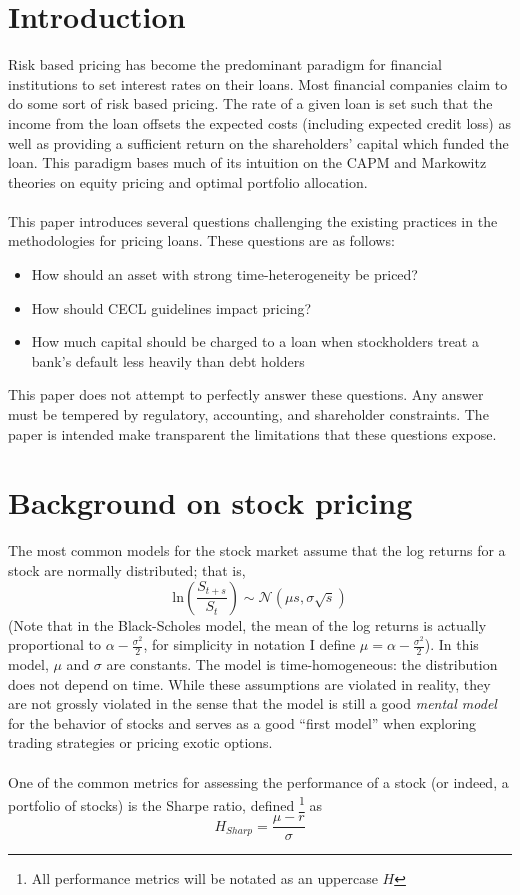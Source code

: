 \documentclass{article}
\begin{document}
\section{Introduction}
Risk based pricing has become the predominant paradigm for financial institutions to set interest rates on their loans.  Most financial companies claim to do some sort of risk based pricing.  The rate of a given loan is set such that the income from the loan offsets the expected costs (including expected credit loss) as well as providing a sufficient return on the shareholders' capital which funded the loan.  This paradigm bases much of its intuition on the CAPM and Markowitz theories on equity pricing and optimal portfolio allocation.  
\\
\\
This paper introduces several questions challenging the existing practices in the methodologies for pricing loans.  These questions are as follows:
\begin{itemize}
\item How should an asset with strong time-heterogeneity be priced?  
\item How should CECL guidelines impact pricing? 
\item How much capital should be charged to a loan when stockholders treat a bank's default less heavily than debt holders
\end{itemize}

This paper does not attempt to perfectly answer these questions.  Any answer must be tempered by regulatory, accounting, and shareholder constraints.  The paper is intended make transparent the limitations that these questions expose.  

\section{Background on stock pricing}

The most common models for the stock market assume that the log returns for a stock are normally distributed; that is,
\[\mathrm{ln}\left(\frac{S_{t+s}}{S_t}\right) \sim \mathcal{N}(\mu s, \sigma \sqrt{s})\]
(Note that in the Black-Scholes model, the mean of the log returns is actually proportional to \(\alpha-\frac{\sigma^2}{2}\), for simplicity in notation I define \(\mu=\alpha-\frac{\sigma^2}{2}\)).  In this model, \(\mu\) and \(\sigma\) are constants.  The model is time-homogeneous: the distribution does not depend on time.  While these assumptions are violated in reality, they are not grossly violated in the sense that the model is still a good \emph{mental model} for the behavior of stocks and serves as a good ``first model'' when exploring trading strategies or pricing exotic options.  
\\
\\
One of the common metrics for assessing the performance of a stock (or indeed, a portfolio of stocks) is the Sharpe ratio, defined \footnote{All performance metrics will be notated as an uppercase \(H\)} as 
\[H_{Sharp}=\frac{\mu-r}{\sigma}\]
\end{document}
